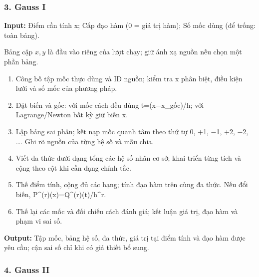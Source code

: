 \examplebreak\subsubsection*{3. Gauss I}

\textbf{Input:} Điểm cần tính x;\allowbreak{} Cấp đạo hàm (\allowbreak{}0 =\allowbreak{} giá trị hàm);\allowbreak{} Số mốc dùng (\allowbreak{}để trống: toàn bảng).

Bảng cặp $x,y$ là đầu vào riêng của lượt chạy; giữ ánh xạ nguồn nếu chọn một phần bảng.

\begin{enumerate}

\item Công bố tập mốc thực dùng và ID nguồn;\allowbreak{} kiểm tra x phân biệt,\allowbreak{} điều kiện lưới và số mốc của phương pháp.

\item Đặt biến và gốc: với mốc cách đều dùng t=\allowbreak{}(\allowbreak{}x\ensuremath{-}x\_gốc)/\allowbreak{}h;\allowbreak{} với Lagrange/\allowbreak{}Newton bất kỳ giữ biến x.

\item Lập bảng sai phân;\allowbreak{} kết nạp mốc quanh tâm theo thứ tự 0,\allowbreak{} +\allowbreak{}1,\allowbreak{} \ensuremath{-}1,\allowbreak{} +\allowbreak{}2,\allowbreak{} \ensuremath{-}2,\allowbreak{} …. Ghi rõ nguồn của từng hệ số và mẫu chia.

\item Viết đa thức dưới dạng tổng các hệ số nhân cơ sở;\allowbreak{} khai triển từng tích và cộng theo cột khi cần dạng chính tắc.

\item Thế điểm tính,\allowbreak{} cộng đủ các hạng;\allowbreak{} tính đạo hàm trên cùng đa thức. Nếu đổi biến,\allowbreak{} P\textasciicircum{}(\allowbreak{}r)(\allowbreak{}x)=\allowbreak{}Q\textasciicircum{}(\allowbreak{}r)(\allowbreak{}t)/\allowbreak{}h\textasciicircum{}r.

\item Thế lại các mốc và đối chiếu cách đánh giá;\allowbreak{} kết luận giá trị,\allowbreak{} đạo hàm và phạm vi sai số.

\end{enumerate}

\textbf{Output:} Tập mốc,\allowbreak{} bảng hệ số,\allowbreak{} đa thức,\allowbreak{} giá trị tại điểm tính và đạo hàm được yêu cầu;\allowbreak{} cận sai số chỉ khi có giả thiết bổ sung.

\examplebreak\subsubsection*{4. Gauss II}

